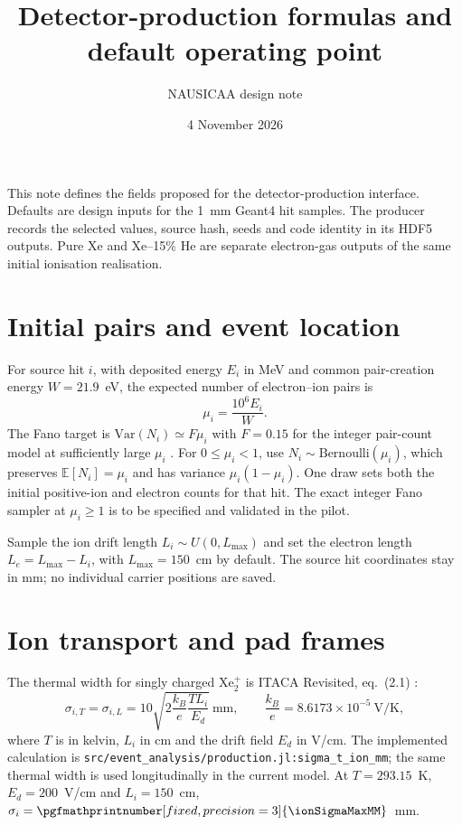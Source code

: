 \documentclass[11pt]{article}
\title{Detector-production formulas and default operating point}
\author{NAUSICAA design note}
\date{4 November 2026}
\newcommand{\TPCcm}{150}
\newcommand{\TemperatureK}{293.15}
\newcommand{\DriftFieldVcm}{200}
\begin{document}
\maketitle
\noindent This note defines the fields proposed for the detector-production
interface. Defaults are design inputs for the 1~mm Geant4 hit samples. The
producer records the selected values, source hash, seeds and code identity in
its HDF5 outputs. Pure Xe and Xe--15\% He are separate electron-gas outputs
of the same initial ionisation realisation.

\section{Initial pairs and event location}
For source hit $i$, with deposited energy $E_i$ in MeV and common pair-creation
energy $W=21.9$~eV, the expected number of electron--ion pairs is
\begin{equation}
  \mu_i=\frac{10^6 E_i}{W}.
\end{equation}
The Fano target is $\mathrm{Var}(N_i)\simeq F\mu_i$ with $F=0.15$ for the
integer pair-count model at sufficiently large $\mu_i$ \cite{Oliveira:2011xk}.
For $0\leq\mu_i<1$, use $N_i\sim\mathrm{Bernoulli}(\mu_i)$, which preserves
$\mathbb{E}[N_i]=\mu_i$ and has variance $\mu_i(1-\mu_i)$. One draw sets both
the initial positive-ion and electron counts for that hit. The exact integer
Fano sampler at $\mu_i\geq1$ is to be specified and validated in the pilot.

Sample the ion drift length $L_i\sim U(0,L_{\max})$ and set the electron
length $L_e=L_{\max}-L_i$, with $L_{\max}=\TPCcm$~cm by default. The source
hit coordinates stay in mm; no individual carrier positions are saved.

\section{Ion transport and pad frames}
The thermal width for singly charged Xe$_2^+$ is ITACA Revisited,
eq.~(2.1) \cite{itaca2026}:
\begin{equation}
 \sigma_{i,T}=\sigma_{i,L}=
 10\sqrt{2\frac{k_B}{e}\frac{T L_i}{E_d}}\ \mathrm{mm},
 \qquad \frac{k_B}{e}=8.6173\times10^{-5}\ \mathrm{V/K},
\end{equation}
where $T$ is in kelvin, $L_i$ in cm and the drift field $E_d$ in V/cm.
The implemented calculation is
\texttt{src/event\_analysis/production.jl:sigma\_t\_ion\_mm}; the same
thermal width is used longitudinally in the current model.
At $T=\TemperatureK$~K, $E_d=\DriftFieldVcm$~V/cm and
$L_i=\TPCcm$~cm, $\sigma_i=\pgfmathprintnumber[fixed,precision=3]{\ionSigmaMaxMM}$~mm.
\end{document}
